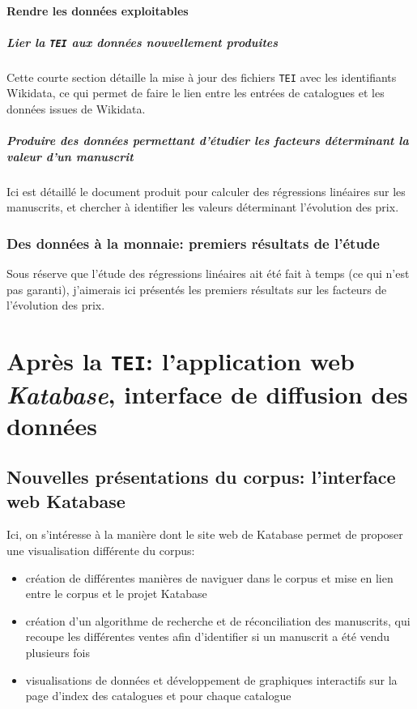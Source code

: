 \documentclass[a4paper, 12pt, twoside]{book}
\newcommand{\tei}{\texttt{TEI}}
\begin{document}
\subsection{Rendre les données exploitables}
\subsubsection{Lier la \tei{} aux données nouvellement produites}
Cette courte section détaille la mise à jour des fichiers \tei{} avec les identifiants Wikidata, ce qui permet de faire le lien entre les entrées de catalogues et les données issues de Wikidata.

\subsubsection{Produire des données permettant d'étudier les facteurs déterminant la valeur d'un manuscrit}
Ici est détaillé le document produit pour calculer des régressions linéaires sur les manuscrits, et chercher à identifier les valeurs déterminant l'évolution des prix.

\section{Des données à la monnaie: premiers résultats de l'étude}
Sous réserve que l'étude des régressions linéaires ait été fait à temps (ce qui n'est pas garanti), j'aimerais ici présentés les premiers résultats sur les facteurs de l'évolution des prix.


\part{Après la \tei{}: l'application web \textit{Katabase}, interface de diffusion des données}
\chapter{Nouvelles présentations du corpus: l'interface web Katabase}
Ici, on s'intéresse à la manière dont le site web de Katabase permet de proposer une visualisation différente du corpus:
\begin{itemize}
 \item création de différentes manières de naviguer dans le corpus et mise en lien entre le corpus et le projet Katabase
 \item création d'un algorithme de recherche et de réconciliation des manuscrits, qui recoupe les différentes ventes afin d'identifier si un manuscrit a été vendu plusieurs fois
 \item visualisations de données et développement de graphiques interactifs sur la page d'index des catalogues et pour chaque catalogue
\end{itemize}
\end{document}
